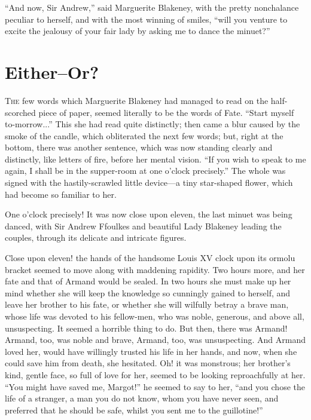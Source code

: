 \documentclass[paper=5.5in:8.5in,BCOR=7mm,twoside,DIV=calc,12pt,usegeometry,chapterprefix,endperiod,headings=big]{scrbook}
\begin{document}
\enquote{And now, Sir Andrew,} said Marguerite Blakeney, with the pretty nonchalance peculiar to herself, and with the most winning of smiles, \enquote{will you venture to excite the jealousy of your fair lady by asking me to dance the minuet?}

\chapter[Either---Or?]{Either–Or?}
\lettrine[lines=4]{T}{he} few words which Marguerite Blakeney had managed to read on the half-scorched piece of paper, seemed literally to be the words of Fate. \enquote{Start myself to-morrow...} This she had read quite distinctly; then came a blur caused by the smoke of the candle, which obliterated the next few words; but, right at the bottom, there was another sentence, which was now standing clearly and distinctly, like letters of fire, before her mental vision. \enquote{If you wish to speak to me again, I shall be in the supper-room at one o'clock precisely.} The whole was signed with the hastily-scrawled little device---a tiny star-shaped flower, which had become so familiar to her.

One o'clock precisely! It was now close upon eleven, the last minuet was being danced, with Sir Andrew Ffoulkes and beautiful Lady Blakeney leading the couples, through its delicate and intricate figures.

Close upon eleven! the hands of the handsome Louis XV clock upon its ormolu bracket seemed to move along with maddening rapidity. Two hours more, and her fate and that of Armand would be sealed. In two hours she must make up her mind whether she will keep the knowledge so cunningly gained to herself, and leave her brother to his fate, or whether she will wilfully betray a brave man, whose life was devoted to his fellow-men, who was noble, generous, and above all, unsuspecting. It seemed a horrible thing to do. But then, there was Armand! Armand, too, was noble and brave, Armand, too, was unsuspecting. And Armand loved her, would have willingly trusted his life in her hands, and now, when she could save him from death, she hesitated. Oh! it was monstrous; her brother's kind, gentle face, so full of love for her, seemed to be looking reproachfully at her. \enquote{You might have saved me, Margot!} he seemed to say to her, \enquote{and you chose the life of a stranger, a man you do not know, whom you have never seen, and preferred that he should be safe, whilst you sent me to the guillotine!}
\end{document}
